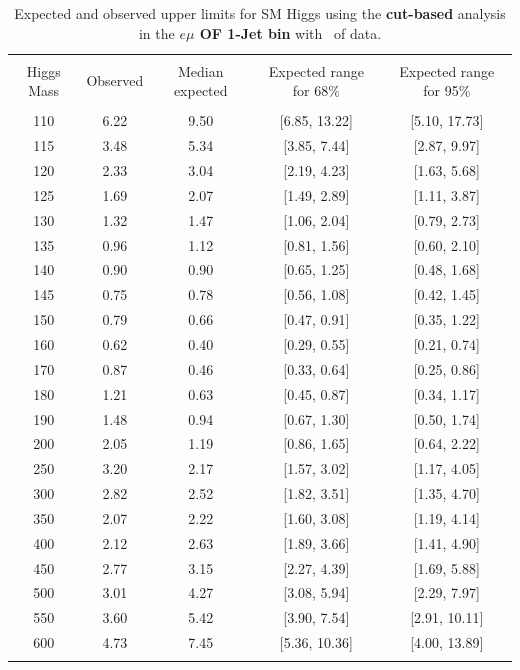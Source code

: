 \begin{table}[hbp!]
\begin{center}
\begin{tabular}{c c c c c}
\hline
\vspace{-3mm} && \\
 Higgs Mass & Observed  & Median expected & Expected range for 68\% & Expected range for 95\%   \\
\vspace{-3mm} && \\
\hline
110 & 6.22 & 9.50 & [6.85, 13.22] & [5.10, 17.73] \\
115 & 3.48 & 5.34 & [3.85, 7.44] & [2.87, 9.97] \\
120 & 2.33 & 3.04 & [2.19, 4.23] & [1.63, 5.68] \\
125 & 1.69 & 2.07 & [1.49, 2.89] & [1.11, 3.87] \\
130 & 1.32 & 1.47 & [1.06, 2.04] & [0.79, 2.73] \\
135 & 0.96 & 1.12 & [0.81, 1.56] & [0.60, 2.10] \\
140 & 0.90 & 0.90 & [0.65, 1.25] & [0.48, 1.68] \\
145 & 0.75 & 0.78 & [0.56, 1.08] & [0.42, 1.45] \\
150 & 0.79 & 0.66 & [0.47, 0.91] & [0.35, 1.22] \\
160 & 0.62 & 0.40 & [0.29, 0.55] & [0.21, 0.74] \\
170 & 0.87 & 0.46 & [0.33, 0.64] & [0.25, 0.86] \\
180 & 1.21 & 0.63 & [0.45, 0.87] & [0.34, 1.17] \\
190 & 1.48 & 0.94 & [0.67, 1.30] & [0.50, 1.74] \\
200 & 2.05 & 1.19 & [0.86, 1.65] & [0.64, 2.22] \\
250 & 3.20 & 2.17 & [1.57, 3.02] & [1.17, 4.05] \\
300 & 2.82 & 2.52 & [1.82, 3.51] & [1.35, 4.70] \\
350 & 2.07 & 2.22 & [1.60, 3.08] & [1.19, 4.14] \\
400 & 2.12 & 2.63 & [1.89, 3.66] & [1.41, 4.90] \\
450 & 2.77 & 3.15 & [2.27, 4.39] & [1.69, 5.88] \\
500 & 3.01 & 4.27 & [3.08, 5.94] & [2.29, 7.97] \\
550 & 3.60 & 5.42 & [3.90, 7.54] & [2.91, 10.11] \\
600 & 4.73 & 7.45 & [5.36, 10.36] & [4.00, 13.89] \\
\vspace{-3mm} && \\
\hline
\hline
\end{tabular}
\caption{Expected and observed upper limits for SM Higgs using the
  {\bf cut-based} analysis in the {\bf $e\mu$ OF 1-Jet bin} with \intlumiEightTeV\ of data.}
\label{tab:cutbase_uls_1jof}
\end{center}
\end{table}


